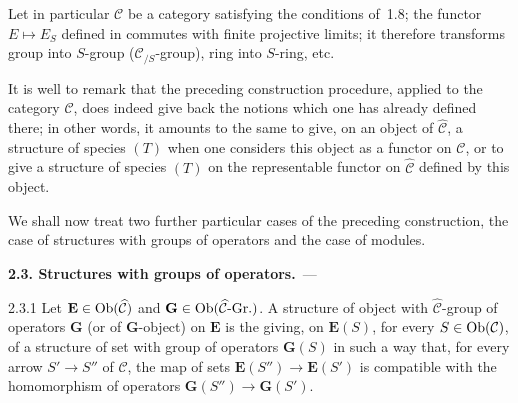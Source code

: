 Let in particular \(\mathcal{C}\) be a category satisfying the conditions
of~1.8; the functor \(E\mapsto E_{S}\)
defined in \loccit commutes with finite projective limits; it therefore
transforms group into \(S\)-group (\ie \(\mathcal{C}_{/S}\)-group), ring into
\(S\)-ring, etc.

\begin{remark*}
It is well to remark that the preceding construction procedure, applied to
the category \(\widehat{\mathcal{C}}\), does indeed give back the notions
which one has already defined there; in other words, it amounts to the same
to give, on an object of \(\widehat{\mathcal{C}}\), a structure of species
\((T)\) when one considers this object as a functor on \(\mathcal{C}\), or to
give a structure of species \((T)\) on the representable functor on
\(\widehat{\mathcal{C}}\) defined by this object.%
\end{remark*}

We shall now treat two further particular cases of the preceding
construction, the case of structures with groups of operators and the case
of modules.

\par{}%
\noindent\textbf{2.3. Structures with groups of operators.}\label{I.2.3}\ ---

\begin{definition}{2.3.1}\label{I.2.3.1}
Let \(\mathbf{E}\in\operatorname{Ob}(\widehat{\mathcal{C}})\) and
\(\mathbf{G}\in\operatorname{Ob}(\widehat{\mathcal{C}}\text{-Gr.})\). A structure of object
with \(\widehat{\mathcal{C}}\)-group of operators \(\mathbf{G}\) (or of
\(\mathbf{G}\)-object) on \(\mathbf{E}\) is the giving, on \(\mathbf{E}(S)\),
for every \(S\in\operatorname{Ob}(\mathcal{C})\), of a structure of set with group of
operators \(\mathbf{G}(S)\) in such a way that, for every arrow
\(S'\to S''\) of \(\mathcal{C}\), the map of sets
\(\mathbf{E}(S'')\to\mathbf{E}(S')\) is compatible with the homomorphism of
operators \(\mathbf{G}(S'')\to\mathbf{G}(S')\).
\end{definition}

